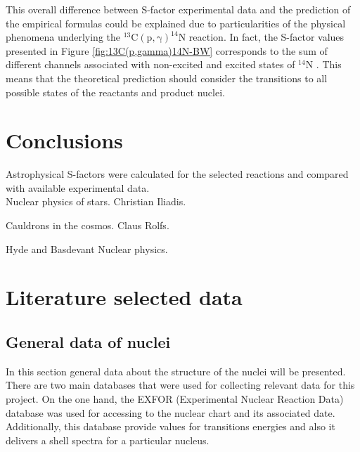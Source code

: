 \documentclass[openany]{book}
\begin{document}
This overall difference between S-factor experimental data and the prediction of the empirical formulas could be explained due to particularities of the physical phenomena underlying the $\mathrm{{}^{13}C(p, \gamma)^{14}N}$ reaction. In fact, the S-factor values presented in Figure \ref{fig:13C(p,gamma)14N-BW} corresponds to the sum of different channels associated with non-excited and excited states of  $\mathrm{{}^{14}N}$ \cite{xu_takahashi_goriely_arnould_ohta_utsunomiya_2013}. This means that the theoretical prediction should consider the transitions to all possible states of the reactants and product nuclei. 



\chapter{Conclusions} \label{ch:conclusions}

Astrophysical S-factors were calculated for the selected reactions and compared with available experimental data.  \\

Nuclear physics of stars. Christian Iliadis.

\vspace{1in}
Cauldrons in the cosmos.  Claus Rolfs.

\vspace{1in}
Hyde and Basdevant Nuclear physics.

\appendix

\chapter{Literature selected data} \label{ap:literatureData}

\section{General data of nuclei} \label{sec:nucleiData}

In this section general data about the structure of the nuclei will be presented. There are two main databases that were used for collecting relevant data for this project. On the one hand, the EXFOR (Experimental Nuclear Reaction Data) database \cite{zerkin_pritychenko_totans_vrapcenjak_rodionov_shulyak_2022} was used for accessing to the nuclear chart and its associated date. Additionally, this database provide values for transitions energies and also it delivers a shell spectra for a particular nucleus. \\
\end{document}

